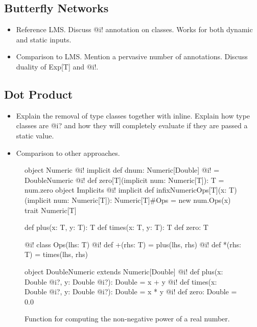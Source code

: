 \subsection{Butterfly Networks}
\begin{itemize}
  \item Reference LMS. Discuss @i! annotation on classes. Works for both dynamic and static inputs.
  \item Comparison to LMS. Mention a pervasive number of annotations. Discuss duality of Exp[T] and @i!.
\end{itemize}




\subsection{Dot Product}
\begin{itemize}
  \item Explain the removal of type classes together with inline. Explain how type classes
  are @i? and how they will completely evaluate if they are passed a static value.
  \item Comparison to other approaches.
\end{itemize}


\begin{figure}
\begin{listing}
object Numeric {
  @i! implicit def dnum: Numeric[Double] @i! = DoubleNumeric
  @i! def zero[T](implicit num: Numeric[T]): T = num.zero
  object Implicits {
    @i! implicit def infixNumericOps[T](x: T)(implicit num: Numeric[T]): Numeric[T]#Ops = new num.Ops(x)
  }
}
trait Numeric[T] {
  def plus(x: T, y: T): T
  def times(x: T, y: T): T
  def zero: T

  @i! class Ops(lhs: T) {
    @i! def +(rhs: T) = plus(lhs, rhs)
    @i! def *(rhs: T) = times(lhs, rhs)
  }
}

object DoubleNumeric extends Numeric[Double] {
  @i! def plus(x: Double @i?, y: Double @i?): Double = x + y
  @i! def times(x: Double @i?, y: Double @i?): Double = x * y
  @i! def zero: Double = 0.0
}
\end{listing}
\caption{\label{lst:vector_deep_ir} Function for computing the non-negative power of a real number.}
\end{figure}
